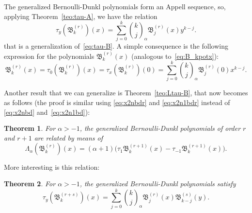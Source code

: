 \documentclass[10pt]{article}
\theoremstyle{plain}
\newtheorem{theorem}{Theorem}[section]
\theoremstyle{definition}
\numberwithin{equation}{section} %
\newcommand{\La}{\Lambda_{\alpha}}
\newcommand{\binoma}[2]{\binom{#1}{#2}_{\!\alpha}}
\newcommand{\B}{\mathfrak{B}}
\begin{document}
The generalized Bernoulli-Dunkl polynomials form an Appell sequence, so, applying Theorem~\ref{teo:tau-A}, we have the relation
\begin{equation}
\label{eq:tau-Br}
  \tau_y(\B_k^{(r)})(x)
  = \sum_{j=0}^k \binoma{k}{j} \B^{(r)}_j(x) y^{k-j}.
\end{equation}
that is a generalization of~\eqref{eq:tau-B}.
A simple consequence is the following expression for the polynomials $\B_k^{(r)}(x)$ (analogous to~\eqref{eq:B_kpotx}):
\[
\B_k^{(r)}(x) = \tau_0(\B^{(r)}_k)(x) = \tau_x(\B^{(r)}_k)(0)
= \sum_{j=0}^k \binoma{k}{j}\B_j^{(r)}(0) x^{k-j}.
\]

Another result that we can generalize is Theorem~\ref{teo:Ltau-B}, that now becomes as follows (the proof is similar using \eqref{eq:x2nbdr} and \eqref{eq:x2n1bdr} instead of \eqref{eq:x2nbd} and~\eqref{eq:x2n1bd}): 

\begin{theorem}
For $\alpha>-1$, the generalized Bernoulli-Dunkl polynomials of order $r$ and $r+1$ are related by means of 
\begin{equation*}
  \La(\B_k^{(r)})(x)
  = (\alpha+1) \big(\tau_1 \B_k^{(r+1)}(x) - \tau_{-1} \B_k^{(r+1)}(x)\big).
\end{equation*}
\end{theorem}

More interesting is this relation:

\begin{theorem}
\label{teo:tau-Brs}
For $\alpha>-1$, the generalized Bernoulli-Dunkl polynomials satisfy
\begin{equation*}
  \tau_y(\B_k^{(r+s)})(x)
  = \sum_{j=0}^k \binoma{k}{j} \B_j^{(r)}(x) \B_{k-j}^{(s)}(y).
\end{equation*}
\end{theorem}
\end{document}
